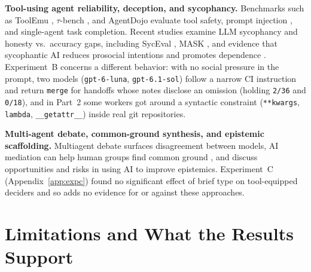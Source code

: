 \documentclass[11pt]{article}
\begin{document}
\textbf{Tool-using agent reliability, deception, and sycophancy.} Benchmarks such as ToolEmu \citep{ruan2023toolemu}, $\tau$-bench \citep{yao2024taubench}, and AgentDojo \citep{debenedetti2024agentdojo} evaluate tool safety, prompt injection \citep{greshake2023injection}, and single-agent task completion. Recent studies examine LLM sycophancy and honesty vs.\ accuracy gaps, including SycEval \citep{fanous2025syceval}, MASK \citep{ren2025mask}, and evidence that sycophantic AI reduces prosocial intentions and promotes dependence \citep{cheng2026sycophantic}. Experiment~B concerns a different behavior: with no social pressure in the prompt, two models (\texttt{gpt-6-luna}, \texttt{gpt-6.1-sol}) follow a narrow CI instruction and return \texttt{merge} for handoffs whose notes disclose an omission (holding \texttt{2/36} and \texttt{0/18}), and in Part~2 some workers got around a syntactic constraint (\texttt{**kwargs}, \texttt{lambda}, \texttt{\_\_getattr\_\_}) inside real git repositories.

\textbf{Multi-agent debate, common-ground synthesis, and epistemic scaffolding.} Multiagent debate \citep{du2023debate} surfaces disagreement between models, AI mediation can help human groups find common ground \citep{tessler2024commonground}, and \citet{cottonbarratt2026epistemics} discuss opportunities and risks in using AI to improve epistemics. Experiment~C (Appendix~\ref{app:expc}) found no significant effect of brief type on tool-equipped deciders and so adds no evidence for or against these approaches.

\section{Limitations and What the Results Support}
\label{sec:lims}
\end{document}
